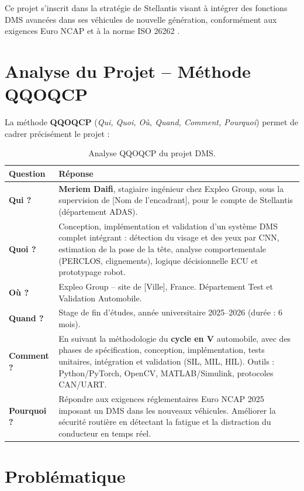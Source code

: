 \documentclass[12pt,a4paper,twoside]{report}
\newcommand{\keyword}[1]{\textbf{\textcolor{stellantisblue}{#1}}}
\begin{document}
Ce projet s'inscrit dans la stratégie de Stellantis visant à intégrer des fonctions DMS avancées dans ses véhicules de nouvelle génération, conformément aux exigences Euro NCAP et à la norme ISO 26262 \cite{iso26262}.

\section{Analyse du Projet -- Méthode QQOQCP}

La méthode \keyword{QQOQCP} (\textit{Qui, Quoi, Où, Quand, Comment, Pourquoi}) permet de cadrer précisément le projet :

\begin{table}[H]
\centering
\caption{Analyse QQOQCP du projet DMS.}
\label{tab:qqoqcp}
\renewcommand{\arraystretch}{1.5}
\begin{tabularx}{\textwidth}{|>{\bfseries\centering\arraybackslash}p{2.5cm}|X|}
\hline
\rowcolor{stellantisblue!15}
\textbf{Question} & \textbf{Réponse} \\
\hline
Qui ? & \textbf{Meriem Daifi}, stagiaire ingénieur chez Expleo Group, sous la supervision de [Nom de l'encadrant], pour le compte de Stellantis (département ADAS). \\
\hline
Quoi ? & Conception, implémentation et validation d'un système DMS complet intégrant : détection du visage et des yeux par CNN, estimation de la pose de la tête, analyse comportementale (PERCLOS, clignements), logique décisionnelle ECU et prototypage robot. \\
\hline
Où ? & Expleo Group -- site de [Ville], France. Département Test et Validation Automobile. \\
\hline
Quand ? & Stage de fin d'études, année universitaire 2025--2026 (durée : 6 mois). \\
\hline
Comment ? & En suivant la méthodologie du \textbf{cycle en V} automobile, avec des phases de spécification, conception, implémentation, tests unitaires, intégration et validation (SIL, MIL, HIL). Outils : Python/PyTorch, OpenCV, MATLAB/Simulink, protocoles CAN/UART. \\
\hline
Pourquoi ? & Répondre aux exigences réglementaires Euro NCAP 2025 imposant un DMS dans les nouveaux véhicules. Améliorer la sécurité routière en détectant la fatigue et la distraction du conducteur en temps réel. \\
\hline
\end{tabularx}
\end{table}

\section{Problématique}
\end{document}

